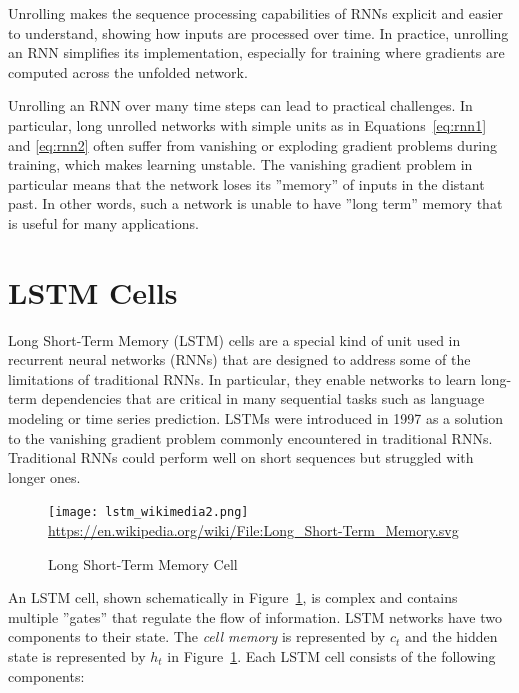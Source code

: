 Unrolling makes the sequence processing capabilities of RNNs explicit and easier to understand, showing how inputs are processed over time. In practice, unrolling an RNN simplifies its implementation, especially for training where gradients are computed across the unfolded network. 

Unrolling an RNN over many time steps can lead to practical challenges. In particular, long unrolled networks with simple units as in Equations~\ref{eq:rnn1} and \ref{eq:rnn2} often suffer from vanishing or exploding gradient problems during training, which makes learning unstable. The vanishing gradient problem in particular means that the network loses its ''memory'' of inputs in the distant past. In other words, such a network is unable to have ''long term'' memory that is useful for many applications.

\section{LSTM Cells}

Long Short-Term Memory (LSTM) cells are a special kind of unit used in recurrent neural networks (RNNs) that are designed to address some of the limitations of traditional RNNs. In particular, they enable networks to learn long-term dependencies that are critical in many sequential tasks such as language modeling or time series prediction. LSTMs were introduced in 1997 as a solution to the vanishing gradient problem commonly encountered in traditional RNNs. Traditional RNNs could perform well on short sequences but struggled with longer ones.

\begin{figure}
\centering

\texttt{[image: lstm\_wikimedia2.png]}
\scriptsize \url{https://en.wikipedia.org/wiki/File:Long_Short-Term_Memory.svg} \normalsize
\caption{Long Short-Term Memory Cell}
\label{fig:lstm}
\end{figure}

An LSTM cell, shown schematically in Figure~\ref{fig:lstm}, is complex and contains multiple ''gates'' that regulate the flow of information. LSTM networks have two components to their state. The \emph{cell memory} is represented by $c_t$ and the hidden state is represented by $h_t$ in Figure~\ref{fig:lstm}. Each LSTM cell consists of the following components:

